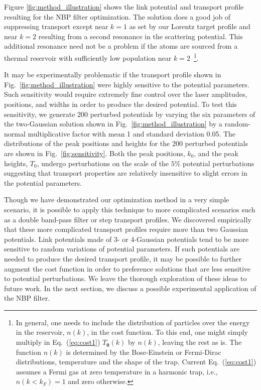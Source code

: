 \documentclass[twocolumn,amsmath,amssymb,showpacs,prl,superscriptaddress,aps]{revtex4-1}
\begin{document}
Figure \ref{fig:method_illustration} shows the link potential and transport profile resulting for the NBP filter optimization. The solution does a good job of suppressing transport except near $k=1$ as set by our Lorentz target profile and near $k=2$ resulting from a second resonance in the scattering potential. This additional resonance need not be a problem if the atoms are sourced from a thermal reservoir with sufficiently low population near $k=2$~\footnote{In general, one needs to include the distribution of particles over the energy in the reservoir, $n(k)$,
in the cost function. To this end, one might simply multiply in Eq.~(\ref{eq:cost1}) $T_{\bm{\theta}}(k)$ by $n(k)$, leaving the rest as is.
The function $n(k)$ is determined by the Bose-Einstein or Fermi-Dirac distributions, temperature and the shape of the trap. Current Eq.~(\ref{eq:cost1}) assumes a Fermi gas 
at zero temperature in a harmonic trap, i.e., $n(k<k_F)=1$ and zero otherwise.}.
 


It may be experimentally problematic if the transport profile shown in Fig.~\ref{fig:method_illustration} were highly sensitive to the potential parameters. Such sensitivity would require extremely fine control over the laser amplitudes, positions, and widths in order to produce the desired potential. To test this sensitivity, we generate 200 perturbed potentials by varying the six parameters of the two-Gaussian solution shown in Fig.~\ref{fig:method_illustration} by a random-normal multiplicative factor with mean 1 and standard deviation 0.05. The distributions of the peak positions and heights for the 200 perturbed potentials are shown in Fig.~\ref{fig:sensitivity}. Both the peak positions, $k_0$, and the peak heights, $T_0$, undergo perturbations on the scale of the $5\%$  potential perturbations suggesting that transport properties are relatively insensitive to slight errors in the potential parameters. 

{\color{blue} Though we have demonstrated our optimization method in a very simple scenario, it is possible to apply this technique to more complicated scenarios such as a double band-pass filter or step transport profiles.  We discovered empirically that these more complicated transport profiles require more than two Gaussian potentials. 
Link potentials made of 3- or 4-Gaussian potentials tend to be more sensitive to random variations of potential parameters. If such potentials are needed to produce the desired transport profile, it may be possible to further augment the cost function in order to preference solutions that are less sensitive to potential perturbations.
We leave the thorough exploration of these ideas to future work. In the next section, we discuss a possible experimental application of the NBP filter. }
\end{document}
